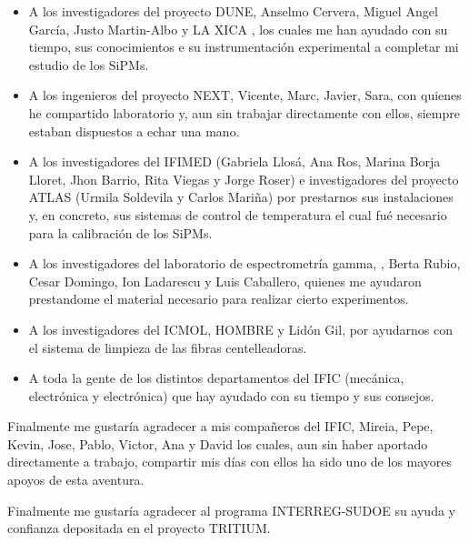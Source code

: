 \begin{itemize}

\item{} A los investigadores del proyecto DUNE, Anselmo Cervera, Miguel Angel García, Justo Martin-Albo y LA XICA , los cuales me han ayudado con su tiempo, sus conocimientos e su instrumentación experimental a completar mi estudio de los SiPMs. 

\item{} A los ingenieros del proyecto NEXT, Vicente, Marc, Javier, Sara, con quienes he compartido laboratorio y, aun sin trabajar directamente con ellos, siempre estaban dispuestos a echar una mano. 

\item{} A los investigadores del IFIMED (Gabriela Llosá, Ana Ros, Marina Borja Lloret, Jhon Barrio, Rita Viegas y Jorge Roser) e investigadores del proyecto ATLAS (Urmila Soldevila y Carlos Mariña) por prestarnos sus instalaciones y, en concreto, sus sistemas de control de temperatura el cual fué necesario para la calibración de los SiPMs. 

\item{} A los investigadores del laboratorio de espectrometría gamma, , Berta Rubio, Cesar Domingo, Ion Ladarescu y Luis Caballero, quienes me ayudaron prestandome el material necesario para realizar cierto experimentos.

\item{} A los investigadores del ICMOL, HOMBRE y Lidón Gil, por ayudarnos con el sistema de limpieza de las fibras centelleadoras.

\item{} A toda la gente de los distintos departamentos del IFIC (mecánica, electrónica y electrónica) que hay ayudado con su tiempo y sus consejos.

\end{itemize} 

Finalmente me gustaría agradecer a mis compañeros del IFIC, Mireia, Pepe, Kevin, Jose, Pablo, Victor, Ana y David los cuales, aun sin haber aportado directamente a trabajo, compartir mis días con ellos ha sido uno de los mayores apoyos de esta aventura.

Finalmente me gustaría agradecer al programa INTERREG-SUDOE su ayuda y confianza depositada en el proyecto TRITIUM.